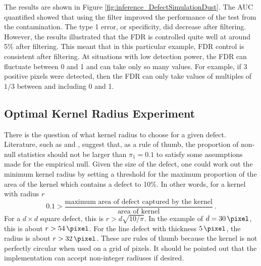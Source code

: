 The results are shown in Figure \ref{fig:inference_DefectSimulationDust}. The AUC quantified showed that using the filter improved the performance of the test from the contamination. The type 1 error, or specificity, did decrease after filtering. However, the results illustrated that the FDR is controlled quite well at around 5\% after filtering. This meant that in this particular example, FDR control is consistent after filtering. At situations with low detection power, the FDR can fluctuate between 0 and 1 and can take only so many values. For example, if 3 positive pixels were detected, then the FDR can only take values of multiples of $1/3$ between and including 0 and 1.

\subsection{Optimal Kernel Radius Experiment}

There is the question of what kernel radius to choose for a given defect. Literature, such as \cite{efron2004large} and \cite{schwartzman2008empirical}, suggest that, as a rule of thumb, the proportion of non-null statistics should not be larger than $\pi_1=0.1$ to satisfy some assumptions made for the empirical null. Given the size of the defect, one could work out the minimum kernel radius by setting a threshold for the maximum proportion of the area of the kernel which contains a defect to 10\%. In other words, for a kernel with radius $r$
\begin{equation}
0.1 > \dfrac{\text{maximum area of defect captured by the kernel}}{\text{area of kernel}} \ .
\end{equation}
For a $d \times d$ square defect, this is $r > d \sqrt{10/\pi}$.
In the example of $d=\SI{30}{\pixel}$, this is about $r>\SI{54}{\pixel}$. For the line defect with thickness $\SI{5}{\pixel}$, the radius is about $r>\SI{32}{\pixel}$. These are rules of thumb because the kernel is not perfectly circular when used on a grid of pixels. It should be pointed out that the implementation can accept non-integer radiuses if desired.

